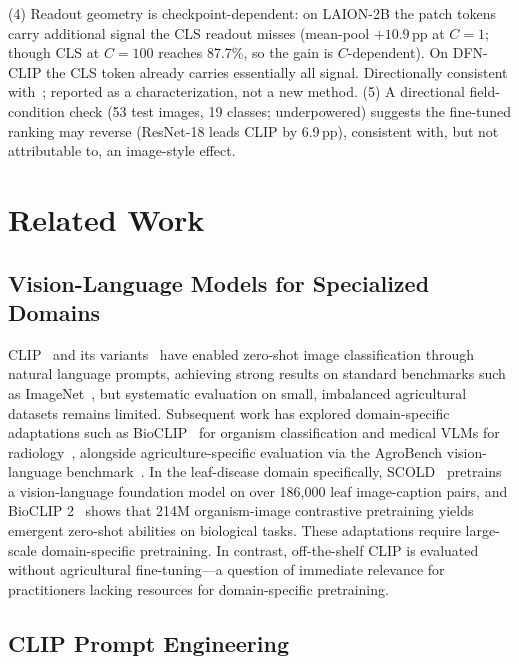 \documentclass[10pt,a4paper]{article}
\begin{document}
(4) Readout geometry is checkpoint-dependent: on LAION-2B the patch tokens carry additional signal the CLS readout misses (mean-pool $+10.9$\,pp at $C{=}1$; though CLS at $C{=}100$ reaches 87.7\%, so the gain is $C$-dependent). On DFN-CLIP the CLS token already carries essentially all signal. Directionally consistent with~\cite{shi2026registers}; reported as a characterization, not a new method.
(5) A directional field-condition check (53 test images, 19 classes; underpowered) suggests the fine-tuned ranking may reverse (ResNet-18 leads CLIP by 6.9\,pp), consistent with, but not attributable to, an image-style effect.

\section{Related Work}
\label{sec:related}

\subsection{Vision-Language Models for Specialized Domains}

CLIP~\cite{radford2021learning} and its variants~\cite{zhai2023sigmoid,cherti2023reproducible} have enabled zero-shot image classification through natural language prompts, achieving strong results on standard benchmarks such as ImageNet~\cite{deng2009imagenet}, but systematic evaluation on small, imbalanced agricultural datasets remains limited.
Subsequent work has explored domain-specific adaptations such as BioCLIP~\cite{stevens2024bioclip} for organism classification and medical VLMs for radiology~\cite{huang2021gloria}, alongside agriculture-specific evaluation via the AgroBench vision-language benchmark~\cite{shinoda2025agrobench}.
In the leaf-disease domain specifically, SCOLD~\cite{scold2025} pretrains a vision-language foundation model on over 186,000 leaf image-caption pairs, and BioCLIP 2~\cite{bioclip2} shows that 214M organism-image contrastive pretraining yields emergent zero-shot abilities on biological tasks.
These adaptations require large-scale domain-specific pretraining.
In contrast, off-the-shelf CLIP is evaluated without agricultural fine-tuning---a question of immediate relevance for practitioners lacking resources for domain-specific pretraining.

\subsection{CLIP Prompt Engineering}
\end{document}

